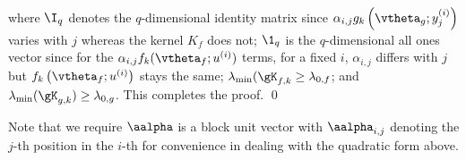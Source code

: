 where $\I_q$ denotes the $q$-dimensional identity matrix since $\alpha_{i,j} g_k\left(\vtheta_g; y^{(i)}_j\right)$ varies with $j$ whereas the kernel $K_f$ does not; $\1_q$ is the $q$-dimensional all ones vector since for the $\alpha_{i,j} f_k (\vtheta_f; u^{(i)})$ terms, for a fixed $i$, $\alpha_{i,j}$ differs with $j$ but $f_k \left(\vtheta_f; u^{(i)}\right)$ stays the same; $\lambda_{\min}( \gK_{f,k} \geq \lambda_{0,f}$; and $\lambda_{\min}( \gK_{g,k}) \geq \lambda_{0,g}$. This completes the proof. \qed

Note that we require $\aalpha$ is a block unit vector with $\aalpha_{i,j}$ denoting the $j$-th position in the $i$-th
for convenience in dealing with the quadratic form above.
